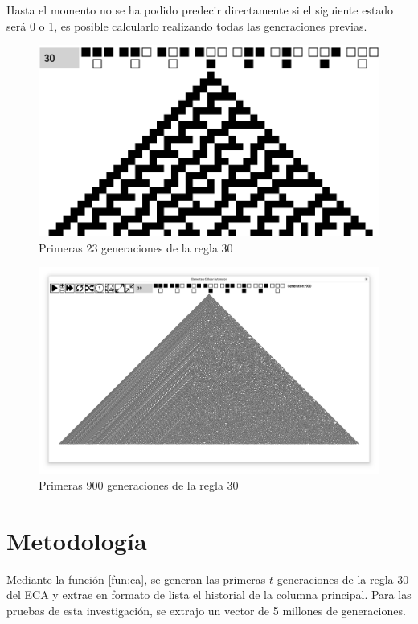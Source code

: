 \documentclass[12pt,twoside]{article}
\begin{document}
	Hasta el momento no se ha podido predecir directamente si el siguiente estado será 0 o 1, es posible calcularlo realizando todas las generaciones previas.
	
	\begin{figure}[H]
		\centering
		\includegraphics[width=\textwidth]{img/r30_1.png}
		\caption{Primeras 23 generaciones de la regla 30}
		\label{img:r30_1}
	\end{figure}
	
	\begin{figure}[H]
		\centering
		\includegraphics[width=\textwidth]{img/r30_2.png}
		\caption{Primeras 900 generaciones de la regla 30}
		\label{img:r30_2}
	\end{figure}
	
	\section{Metodología}
	
	Mediante la función \ref{fun:ca}, se generan las primeras $t$ generaciones de la regla 30 del ECA y extrae en formato de lista el historial de la columna principal. Para las pruebas de esta investigación, se extrajo un vector de 5 millones de generaciones.
	
\end{document}
